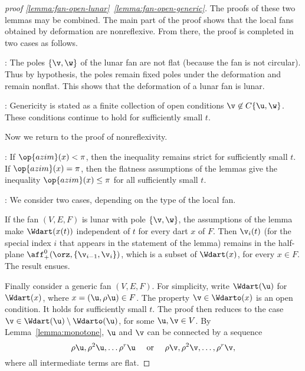 \begin{proof}[proof \eqref{lemma:fan-open-lunar}~\eqref{lemma:fan-open-generic}] 
  The proofs of these two lemmas may be combined.  The main part of
  the proof shows that the local fans obtained by deformation are
  nonreflexive.  From there, the proof is completed in two cases as
  follows.

  : The poles $\{\v,\w\}$ of the lunar fan are not flat
  (because the fan is not circular). Thus by hypothesis, the poles
  remain fixed poles under the deformation and remain nonflat.  This
  shows that the deformation of a lunar fan is lunar.

  : Genericity is stated as a finite collection of
open conditions $\v\not\in
  C\{\u,\w\}$.  These conditions continue to hold for sufficiently
  small $t$.

Now we return to the proof of nonreflexivity.

: If $\op{azim}(x)<\pi$, then the inequality remains
strict for sufficiently small $t$.  If $\op{azim}(x)=\pi$, then the
flatness assumptions of the lemmas give the inequality 
$\op{azim}(x)\le\pi$ for all sufficiently small $t$.

: We consider two cases, depending on the type of
the local fan.


If the fan $(V,E,F)$ is lunar with pole $\{\v,\w\}$, the assumptions
of the lemma make $\Wdart(x(t))$ independent of $t$ for every dart $x$
of $F$.  Then $\v_i(t)$ (for the special index $i$ that appears in the
statement of the lemma) remains in the half-plane
$\aff_+^0(\orz,\{\v_{i-1},\v_i\})$, which is a subset of $\Wdart(x)$,
for every $x\in F$.  The result ensues.

Finally consider a generic fan $(V,E,F)$.  For simplicity, write
$\Wdart(\u)$ for $\Wdart(x)$, where $x=(\u,\rho\u)\in F$.  The
property $\v\in \Wdarto(x)$ is an open condition.  It holds for
sufficiently small $t$.  The proof then reduces to the case
$\v\in \Wdart(\u)\setminus \Wdarto(\u)$, for some $\u,\v\in V$.  By
Lemma~\ref{lemma:monotone}, $\u$ and $\v$ can be connected by a
sequence
\[
\rho\u, \rho^2\u,\ldots \rho^r\u\quad\text{ or }\quad 
\rho\v, \rho^2\v,\ldots,\rho^r\v,
\]
where all intermediate terms are flat.


\end{proof}
